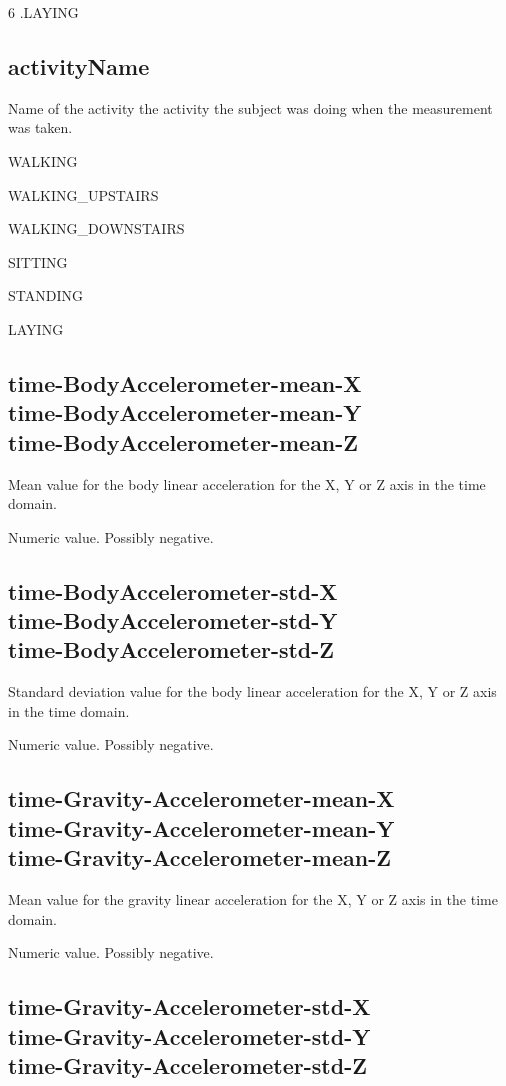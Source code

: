 \documentclass[a4paper,10pt]{report}
\begin{document}
   6 .LAYING

\subsection*{activityName} 

Name of the activity the activity the subject was doing when the measurement was taken.

 WALKING

 WALKING\_UPSTAIRS

 WALKING\_DOWNSTAIRS

 SITTING

 STANDING

 LAYING

\subsection*{time-BodyAccelerometer-mean-X\\time-BodyAccelerometer-mean-Y\\time-BodyAccelerometer-mean-Z} 

Mean value for the body linear acceleration for the X, Y or Z axis in the time domain.

Numeric value. Possibly negative.

\subsection*{time-BodyAccelerometer-std-X\\time-BodyAccelerometer-std-Y\\time-BodyAccelerometer-std-Z} 

Standard deviation value for the body linear acceleration for the X, Y or Z axis in the time domain.

Numeric value. Possibly negative.

\subsection*{time-Gravity-Accelerometer-mean-X\\time-Gravity-Accelerometer-mean-Y\\time-Gravity-Accelerometer-mean-Z} 

Mean value for the gravity linear acceleration for the X, Y or Z axis in the time domain.

Numeric value. Possibly negative.

\subsection*{time-Gravity-Accelerometer-std-X\\time-Gravity-Accelerometer-std-Y\\time-Gravity-Accelerometer-std-Z} 
\end{document}
